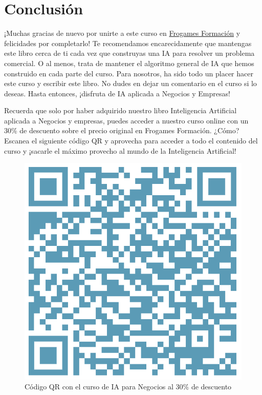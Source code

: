 \documentclass[
]{book}
\begin{document}
\hypertarget{conclusiuxf3n}{%
\chapter*{Conclusión}\label{conclusiuxf3n}}

¡Muchas gracias de nuevo por unirte a este curso en \href{https://cursos.frogamesformacion.com/courses/ia-aplicada-negocios?et=paid\&ref=846b3f\&coupon=frogames30}{Frogames Formación} y felicidades por completarlo! Te recomendamos encarecidamente que mantengas este libro cerca de ti cada vez que construyas una IA para resolver un problema comercial. O al menos, trata de mantener el algoritmo general de IA que hemos construido en cada parte del curso. Para nosotros, ha sido todo un placer hacer este curso y escribir este libro. No dudes en dejar un comentario en el curso si lo deseas. Hasta entonces, ¡disfruta de IA aplicada a Negocios y Empresas!

Recuerda que solo por haber adquirido nuestro libro Inteligencia Artificial aplicada a Negocios y empresas, puedes acceder a nuestro curso online con un 30\% de descuento sobre el precio original en Frogames Formación. ¿Cómo? Escanea el siguiente código QR y aprovecha para acceder a todo el contenido del curso y ¡sacarle el máximo provecho al mundo de la Inteligencia Artificial!

\begin{figure}
\centering
\includegraphics{Images/qr_course.png}
\caption{Código QR con el curso de IA para Negocios al 30\% de descuento}
\end{figure}
\end{document}
